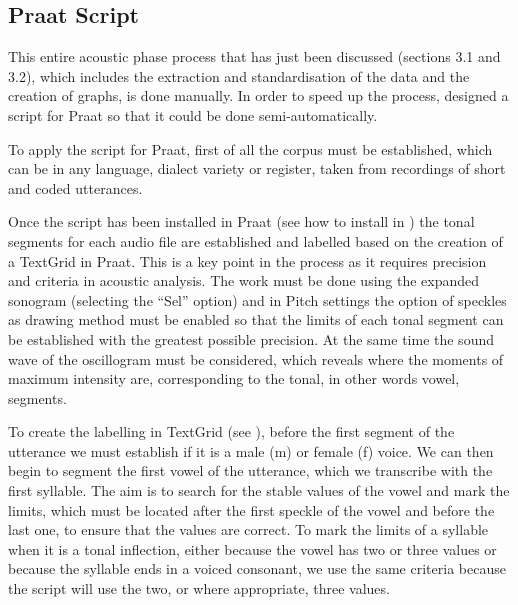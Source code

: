 \documentclass[output=paper]{langscibook}
\begin{document}
\subsection{Praat Script}
\label{sec:font:3.3}
This entire acoustic phase process that has just been discussed (sections 3.1 and 3.2), which includes the extraction and standardisation of the data and the creation of graphs, is done manually. In order to speed up the process, \citet{MateoRuiz.2010Scripts,MateoRuiz.2010protocolo} designed a script for Praat so that it could be done semi-au\-to\-mat\-ical\-ly.

To apply the script for Praat, first of all the corpus must be established, which can be in any language, dialect variety or register, taken from recordings of short and coded utterances. 

Once the script has been installed in Praat (see how to install in \citealt{MateoRuiz.2010Scripts}) the tonal segments for each audio file are established and labelled based on the creation of a TextGrid in Praat. This is a key point in the process as it requires precision and criteria in acoustic analysis. The work must be done using the expanded sonogram (selecting the ``Sel'' option) and in Pitch settings the option of speckles as drawing method must be enabled so that the limits of each tonal segment can be established with the greatest possible precision. At the same time the sound wave of the oscillogram must be considered, which reveals where the moments of maximum intensity are, corresponding to the tonal, in other words vowel, segments.

To create the labelling in TextGrid (see ), before the first segment of the utterance we must establish if it is a male (m) or female (f) voice. We can then begin to segment the first vowel of the utterance, which we transcribe with the first syllable. The aim is to search for the stable values of the vowel and mark the limits, which must be located after the first speckle of the vowel and before the last one, to ensure that the values are correct. To mark the limits of a syllable when it is a tonal inflection, either because the vowel has two or three values or because the syllable ends in a voiced consonant, we use the same criteria because the script will use the two, or where appropriate, three values.
\end{document}
